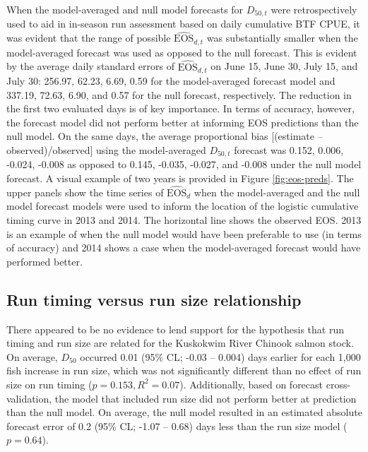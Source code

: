\documentclass[12pt,]{book}
\theoremstyle{definition}
\theoremstyle{definition}
\theoremstyle{definition}
\theoremstyle{remark}
\begin{document}
\noindent
When the model-averaged and null model forecasts for \(D_{50,t}\) were
retrospectively used to aid in in-season run assessment based on daily
cumulative BTF CPUE, it was evident that the range of possible
\(\widehat{\text{EOS}}_{d,t}\) was substantially smaller when the
model-averaged forecast was used as opposed to the null forecast. This
is evident by the average daily standard errors of
\(\widehat{\text{EOS}}_{d,t}\) on June 15, June 30, July 15, and July
30: 256.97, 62.23, 6.69, 0.59 for the model-averaged forecast model and
337.19, 72.63, 6.90, and 0.57 for the null forecast, respectively. The
reduction in the first two evaluated days is of key importance. In terms
of accuracy, however, the forecast model did not perform better at
informing EOS predictions than the null model. On the same days, the
average proportional bias {[}(estimate -- observed)/observed{]} using
the model-averaged \(D_{50,t}\) forecast was 0.152, 0.006, -0.024,
-0.008 as opposed to 0.145, -0.035, -0.027, and -0.008 under the null
model forecast. A visual example of two years is provided in Figure
\ref{fig:eos-preds}. The upper panels show the time series of
\(\widehat{\text{EOS}}_{d}\) when the model-averaged and the null model
forecast models were used to inform the location of the logistic
cumulative timing curve in 2013 and 2014. The horizontal line shows the
observed EOS. 2013 is an example of when the null model would have been
preferable to use (in terms of accuracy) and 2014 shows a case when the
model-averaged forecast would have performed better.

\subsection{Run timing versus run size
relationship}\label{run-timing-versus-run-size-relationship}

\noindent
There appeared to be no evidence to lend support for the hypothesis that
run timing and run size are related for the Kuskokwim River Chinook
salmon stock. On average, \(D_{50}\) occurred 0.01 (95\% CL; -0.03 --
0.004) days earlier for each 1,000 fish increase in run size, which was
not significantly different than no effect of run size on run timing
(\(p = 0.153, R^2 = 0.07\)). Additionally, based on forecast
cross-validation, the model that included run size did not perform
better at prediction than the null model. On average, the null model
resulted in an estimated absolute forecast error of 0.2 (95\% CL; -1.07
-- 0.68) days less than the run size model (\(p = 0.64\)).
\end{document}
